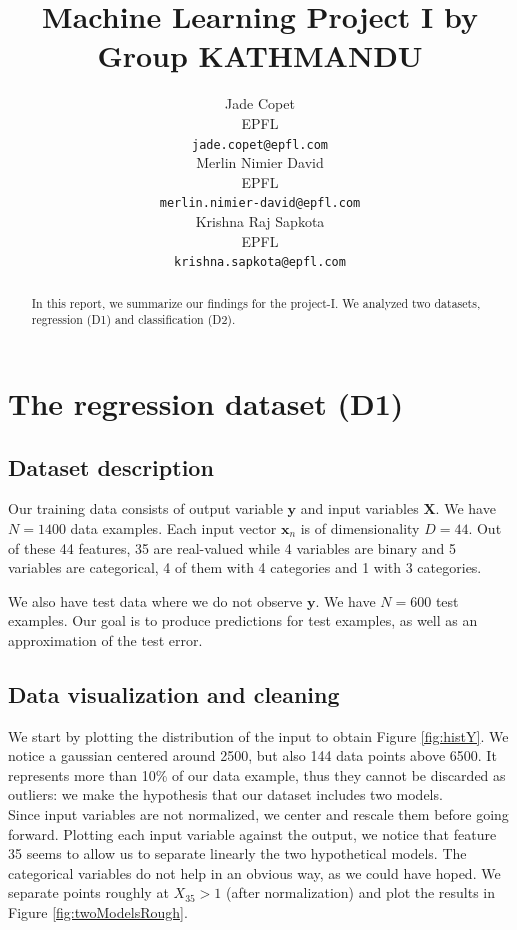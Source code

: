 \documentclass{article} %
\title{Machine Learning Project I by Group KATHMANDU}
\author{
Jade Copet\\
EPFL \\
\texttt{jade.copet@epfl.com} \\
\And
Merlin Nimier David\\
EPFL \\
\texttt{merlin.nimier-david@epfl.com} \\
\And
Krishna Raj Sapkota\\
EPFL \\
\texttt{krishna.sapkota@epfl.com} \\
}
\begin{document}
\maketitle



\begin{abstract}
  In this report, we summarize our findings for the project-I. We analyzed two datasets, regression (D1) and classification (D2).
\end{abstract}



\section{The regression dataset (D1)}

  \subsection{Dataset description}
  Our training data consists of output variable $\mathbf{y}$ and input variables $\mathbf{X}$. We have $N = 1400$ data examples. Each input vector $\mathbf{x}_n$ is of dimensionality $D = 44$. Out of these 44 features, 35 are real-valued while 4 variables are binary and 5 variables are categorical, 4 of them with 4 categories and 1 with 3 categories.

  We also have test data where we do not observe $\mathbf{y}$. We have $N = 600$ test examples. Our goal is to produce predictions for test examples, as well as an approximation of the test error.

  \subsection{Data visualization and cleaning}
  We start by plotting the distribution of the input to obtain Figure \ref{fig:histY}. We notice a gaussian centered around 2500, but also 144 data points above 6500. It represents more than 10\% of our data example, thus they cannot be discarded as outliers: we make the hypothesis that our dataset includes two models.\\

  Since input variables are not normalized, we center and rescale them before going forward. Plotting each input variable against the output, we notice that feature 35 seems to allow us to separate linearly the two hypothetical models. The categorical variables do not help in an obvious way, as we could have hoped. We separate points roughly at $X_{35} > 1$ (after normalization) and plot the results in Figure \ref{fig:twoModelsRough}.
  
\end{document}
